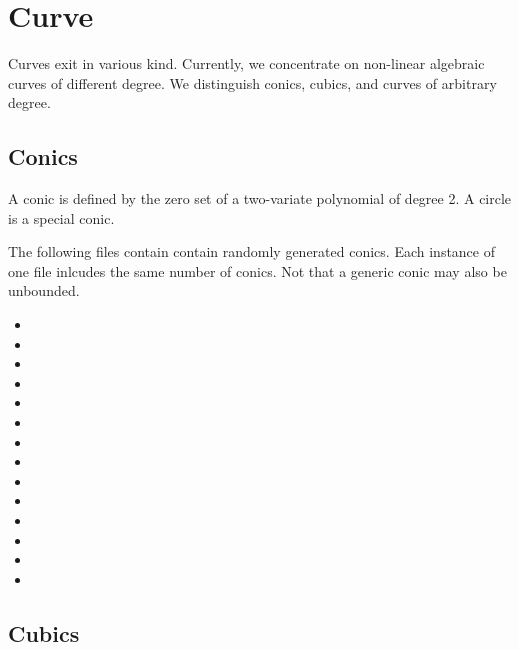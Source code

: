 \section{Curve\label{bi_cha:Curve}}

Curves exit in various kind. Currently, we concentrate on
non-linear algebraic curves of different degree. We 
distinguish conics, cubics, and curves of arbitrary degree.

\subsection{Conics\label{bi_sec:Arrangement2Conics}}

A conic is defined by the zero set of a two-variate polynomial
of degree 2. A circle is a special conic.

The following files contain contain randomly generated conics. 
Each instance of one file inlcudes the same number of conics. Not that
a generic conic may also be unbounded.

\begin{itemize}
\item {}
\item {}
\item {}
\item {}
\item {}
\item {}
\item {}
\item {}
\item {}
\item {}
\item {}
\item {}
\item {}
\item {}
\end{itemize}

\subsection{Cubics}

